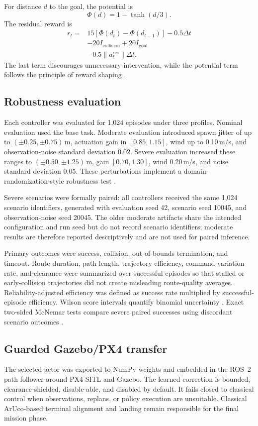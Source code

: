 \documentclass[10pt,twocolumn]{article}
\begin{document}
For distance $d$ to the goal, the potential is
\[
\Phi(d)=1-\tanh(d/3).
\]
The residual reward is
\[
\begin{aligned}
r_t={}&15[\Phi(d_t)-\Phi(d_{t-1})]-0.5\Delta t\\
&-20I_{\mathrm{collision}}+20I_{\mathrm{goal}}\\
&-0.5\lVert a_t^{\mathrm{res}}\rVert\Delta t.
\end{aligned}
\]
The last term discourages unnecessary intervention, while the potential term follows the principle of reward shaping \cite{ng1999}.

\subsection{Robustness evaluation}
Each controller was evaluated for 1,024 episodes under three profiles. Nominal evaluation used the base task. Moderate evaluation introduced spawn jitter of up to $(\pm0.25,\pm0.75)$\,m, actuation gain in $[0.85,1.15]$, wind up to 0.10\,m/s, and observation-noise standard deviation 0.02. Severe evaluation increased these ranges to $(\pm0.50,\pm1.25)$\,m, gain $[0.70,1.30]$, wind 0.20\,m/s, and noise standard deviation 0.05. These perturbations implement a domain-randomization-style robustness test \cite{tobin2017}.

Severe scenarios were formally paired: all controllers received the same 1,024 scenario identifiers, generated with evaluation seed 42, scenario seed 10045, and observation-noise seed 20045. The older moderate artifacts share the intended configuration and run seed but do not record scenario identifiers; moderate results are therefore reported descriptively and are not used for paired inference.

Primary outcomes were success, collision, out-of-bounds termination, and timeout. Route duration, path length, trajectory efficiency, command-variation rate, and clearance were summarized over successful episodes so that stalled or early-collision trajectories did not create misleading route-quality averages. Reliability-adjusted efficiency was defined as success rate multiplied by successful-episode efficiency. Wilson score intervals quantify binomial uncertainty \cite{wilson1927}. Exact two-sided McNemar tests compare severe paired successes using discordant scenario outcomes \cite{mcnemar1947}.

\subsection{Guarded Gazebo/PX4 transfer}
The selected actor was exported to NumPy weights and embedded in the ROS~2 path follower around PX4 SITL and Gazebo. The learned correction is bounded, clearance-shielded, disable-able, and disabled by default. It fails closed to classical control when observations, replans, or policy execution are unsuitable. Classical ArUco-based terminal alignment and landing remain responsible for the final mission phase.
\end{document}
